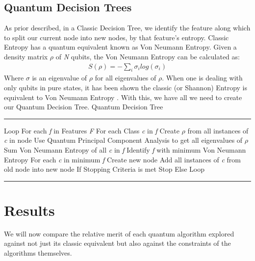 \documentclass[conference]{IEEEtran}
\begin{document}
\subsection{Quantum Decision Trees}
As prior described, in a Classic Decision Tree, we identify the feature along which to split our current node into new nodes, by that feature's entropy. Classic Entropy has a quantum equivalent known as Von Neumann Entropy. Given a density matrix $\rho$ of \emph{N} qubits, the Von Neumann Entropy can be calculated as:
\begin{align*}
    S(\rho) = -\sum_i \sigma_i log(\sigma_i)
\end{align*}
Where $\sigma$ is an eigenvalue of $\rho$ for all eigenvalues of $\rho$. When one is dealing with only qubits in pure states, it has been shown the classic (or Shannon) Entropy is equivalent to Von Neumann Entropy \cite{b9}. With this, we have all we need to create our Quantum Decision Tree. \newline \newline
{\large Quantum Decision Tree} \newline
\noindent\rule{\columnwidth}{1pt}
Loop \newline
\indent For each \emph{f} in Features \emph{F} \newline
\indent \indent For each Class \emph{c} in \emph{f} \newline
\indent \indent \indent Create $\rho$ from all instances of \emph{c} in node \newline
\indent \indent \indent Use Quantum Principal Component Analysis to get \indent \indent \indent all eigenvalues of $\rho$ \newline
\indent \indent Sum Von Neumann Entropy of all \emph{c} in \emph{f} \newline
\indent Identify \emph{f} with minimum Von Neumann Entropy \newline
\indent \indent For each \emph{c} in minimum \emph{f} \newline
\indent \indent \indent Create new node \newline
\indent \indent \indent Add all instances of \emph{c} from old node into new node \newline
\indent If Stopping Criteria is met \newline
\indent \indent Stop \newline
\indent Else \newline
\indent \indent Loop \newline
\noindent\rule{\columnwidth}{1pt}
\section{Results}
We will now compare the relative merit of each quantum algorithm explored against not just its classic equivalent but also against the constraints of the algorithms themselves.
\end{document}

